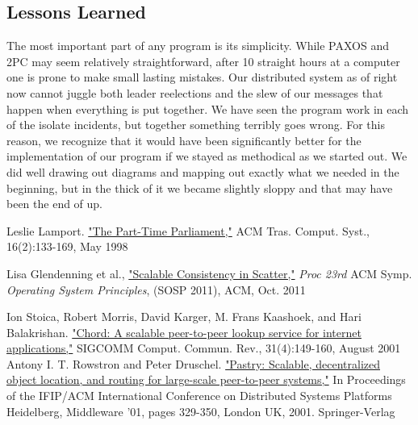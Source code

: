 \documentclass{amsart}
\theoremstyle{definition}
\theoremstyle{remark}
\numberwithin{equation}{section}
\begin{document}
\subsection{Lessons Learned}
The most important part of any program is its simplicity.  While PAXOS and 2PC may seem relatively straightforward, after 10 straight hours at a computer one is prone to make small lasting mistakes.  Our distributed system as of right now cannot juggle both leader reelections and the slew of our messages that happen when everything is put together.  We have seen the program work in each of the isolate incidents, but together something terribly goes wrong.  For this reason, we recognize that it would have been significantly better for the implementation of our program if we stayed as methodical as we started out.  We did well drawing out diagrams and mapping out exactly what we needed in the beginning, but in the thick of it we became slightly sloppy and that may have been the end of up.

\begin{thebibliography}{7}
Leslie Lamport. \href{http://research.microsoft.com/en-us/um/people/lamport/pubs/lamport-paxos.pdf}{"The Part-Time Parliament,"} ACM Tras. Comput. Syst., 16(2):133-169, May 1998

Lisa Glendenning et al.,  \href{http://homes.cs.washington.edu/~arvind/papers/scatter.pdf}{"Scalable Consistency in Scatter,"} \textit{Proc 23rd} ACM
Symp. \textit{Operating System Principles}, (SOSP 2011), ACM, Oct. 2011

Ion Stoica, Robert Morris, David Karger, M. Frans Kaashoek, and Hari Balakrishan. \href{http://pdos.csail.mit.edu/papers/chord:sigcomm01/chord_sigcomm.pdf}{"Chord: A scalable peer-to-peer lookup service for internet applications,"} 
SIGCOMM Comput. Commun. Rev., 31(4):149-160, August 2001
Antony I. T. Rowstron and Peter Druschel. \href{http://www.cs.unibo.it/~babaoglu/courses/cas12-13/resources/tutorials/pastry.pdf}{"Pastry: Scalable, decentralized object location, and routing for large-scale peer-to-peer systems,"} 
In Proceedings of the IFIP/ACM International Conference on Distributed Systems Platforms Heidelberg, Middleware '01, 
pages 329-350, London UK, 2001. Springer-Verlag


\end{thebibliography}
\end{document}
